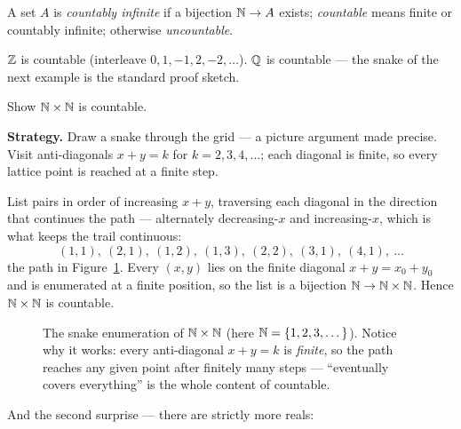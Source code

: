 \begin{definition}
A set $A$ is \emph{countably infinite} if a bijection $\mathbb{N} \to A$ exists;
\emph{countable} means finite or countably infinite; otherwise
\emph{uncountable}.
\end{definition}

$\mathbb{Z}$ is countable (interleave $0,1,-1,2,-2,\dots$). $\mathbb{Q}$ is countable --- the
snake of the next example is the standard proof sketch.

\begin{example}\label{ex:nn}
Show $\mathbb{N} \times \mathbb{N}$ is countable.
\par\smallskip
\textbf{Strategy.} Draw a snake through the grid --- a picture argument made
precise. Visit anti-diagonals $x + y = k$ for $k = 2,3,4,\dots$; each diagonal
is finite, so every lattice point is reached at a finite step.
\par\smallskip
\begin{solution}
List pairs in order of increasing $x + y$, traversing each diagonal in the
direction that continues the path --- alternately decreasing-$x$ and
increasing-$x$, which is what keeps the trail continuous:
\[ (1,1),\ (2,1),\ (1,2),\ (1,3),\ (2,2),\ (3,1),\ (4,1),\ \dots \]
the path in
Figure~\ref{fig:snake}. Every $(x,y)$ lies on the finite diagonal $x+y=x_0+y_0$
and is enumerated at a finite position, so the list is a bijection
$\mathbb{N} \to \mathbb{N} \times \mathbb{N}$. Hence $\mathbb{N} \times \mathbb{N}$ is countable.
\end{solution}
\end{example}

\begin{figure}[ht]\centering

\caption{The snake enumeration of $\mathbb{N} \times \mathbb{N}$ (here $\mathbb{N} =
\{1,2,3,\dots\}$). Notice why it works: every
anti-diagonal $x+y=k$ is \emph{finite}, so the path reaches any given point
after finitely many steps --- ``eventually covers everything'' is the whole
content of countable.}
\label{fig:snake}
\end{figure}

And the second surprise --- there are strictly more reals:

